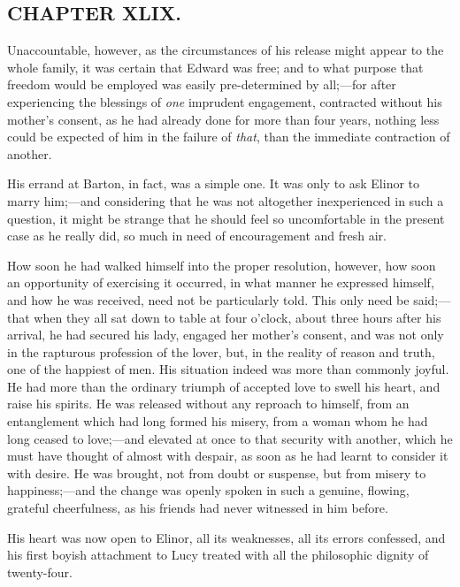\subsection[chapter-xlix.]{\useURL[url49][][][]\from[url49]CHAPTER XLIX.}

Unaccountable, however, as the circumstances of his release might appear to the whole family, it was certain that Edward was free; and to what purpose that freedom would be employed was easily pre-determined by all;---for after experiencing the blessings of {\em one} imprudent engagement, contracted without his mother's consent, as he had already done for more than four years, nothing less could be expected of him in the failure of {\em that}, than the immediate contraction of another.

His errand at Barton, in fact, was a simple one. It was only to ask Elinor to marry him;---and considering that he was not altogether inexperienced in such a question, it might be strange that he should feel so uncomfortable in the present case as he really did, so much in need of encouragement and fresh air.

How soon he had walked himself into the proper resolution, however, how soon an opportunity of exercising it occurred, in what manner he expressed himself, and how he was received, need not be particularly told. This only need be said;---that when they all sat down to table at four o'clock, about three hours after his arrival, he had secured his lady, engaged her mother's consent, and was not only in the rapturous profession of the lover, but, in the reality of reason and truth, one of the happiest of men. His situation indeed was more than commonly joyful. He had more than the ordinary triumph of accepted love to swell his heart, and raise his spirits. He was released without any reproach to himself, from an entanglement which had long formed his misery, from a woman whom he had long ceased to love;---and elevated at once to that security with another, which he must have thought of almost with despair, as soon as he had learnt to consider it with desire. He was brought, not from doubt or suspense, but from misery to happiness;---and the change was openly spoken in such a genuine, flowing, grateful cheerfulness, as his friends had never witnessed in him before.

His heart was now open to Elinor, all its weaknesses, all its errors confessed, and his first boyish attachment to Lucy treated with all the philosophic dignity of twenty-four.

